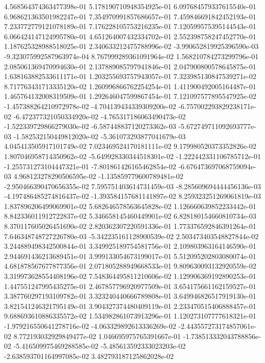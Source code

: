 4.568564374363477398e-01
5.178190710948354925e-01
6.097684579337615540e-01
6.968621363501982247e-01
7.354970991857686657e-01
7.459846691842452193e-01
7.233772779121078189e-01
7.176228105753216235e-01
7.120599575395144543e-01
6.066424147124995780e-01
4.651264007432334702e-01
2.552398758247452770e-01
1.187625328988518025e-01
2.340633212475788996e-02
-3.990652819925396590e-03
-9.323075992587963974e-04
8.767999289361091964e-02
1.568210784273299796e-01
2.085061369470994630e-01
2.137889085797941846e-01
2.047900800578645875e-01
1.638163882533611171e-01
1.203255693757943057e-01
7.323985130847539271e-02
8.717763431713335120e-02
1.260996866762254254e-01
1.411900492005164487e-01
1.465764132008319509e-01
1.292646047599867454e-01
7.121097577895547925e-02
-1.457388264210972978e-02
-4.704139434339309200e-02
-6.757002293829238171e-02
-6.472377321050334920e-02
-4.765317186063490473e-02
-1.522339729866279030e-02
-6.587448837120273362e-03
-5.672749711092693777e-03
-1.582532150449812020e-02
-5.361073293877041679e-03
4.045413505917101749e-02
7.023469524170181111e-02
9.179980520373352826e-02
1.807046958714350962e-02
-5.649928330344518301e-02
-1.222442331106785712e-01
-1.255731273104447321e-01
-7.801861426165462854e-02
-6.676473697068759094e-03
4.968123278290506595e-02
-1.135859779600789481e-02
-2.950466390470656355e-02
7.595751403614731459e-03
-8.285609694444456136e-03
-4.197486485274816437e-02
-1.393584157681141897e-02
8.259323251269061819e-03
1.837896206499069901e-02
5.682646578563645828e-02
1.126660639852233442e-01
8.842336011912722837e-02
5.346658145460449901e-02
6.828180154660810734e-03
8.370117605026451690e-02
2.820362307220591336e-01
1.773376592846391264e-01
7.646348748727226780e-03
-5.342235161128900539e-02
2.503473403548827844e-02
3.244889498342500844e-01
3.349925189754581756e-01
2.109803963164146590e-01
2.944691436213689451e-01
3.999133054673199017e-01
5.512095202803080074e-01
4.681878567677877356e-01
2.071805288949668533e-01
9.809630093132920559e-02
3.319973628554408196e-02
7.548364495811210606e-02
1.129906369192890253e-01
1.447551247995435275e-01
2.467857796920977509e-01
3.654175661162159527e-01
3.387760297193109782e-01
3.323240440666789808e-01
3.649946826517919130e-01
3.821541246321795149e-01
3.904327374480409119e-01
2.233470515406888457e-01
9.688693610886335572e-02
1.534982861073913296e-01
1.120273107777618321e-01
-1.979216550641278716e-02
-4.063329892613336269e-02
-2.443557273174857061e-02
8.772193032929849477e-02
1.046695975765391667e-01
-1.738513332043788856e-02
-5.416509975469288585e-02
-5.485613592333023203e-02
-2.638593701164997085e-02
3.482793187125862028e-02
